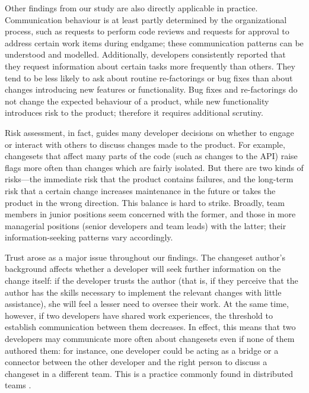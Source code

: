 \documentclass{sig-alternate}
\begin{document}
Other findings from our study are also directly applicable in practice. Communication behaviour is at least partly determined by the organizational process, such as requests to perform code reviews and requests for approval to address certain work items during endgame; these communication patterns can be understood and modelled. Additionally, developers consistently reported that they request information about certain tasks more frequently than others. They tend to be less likely to ask about routine re-factorings or bug fixes than about changes introducing new features or functionality. Bug fixes and re-factorings do not change the expected behaviour of a product, while new functionality introduces risk to the product; therefore it requires additional scrutiny.

Risk assessment, in fact, guides many developer decisions on whether to engage or interact with others to discuss changes made to the product. For example, changesets that affect many parts of the code (such as changes to the API) raise flags more often than changes which are fairly isolated. But there are two kinds of risks---the immediate risk that the product contains failures, and the long-term risk that a certain change increases maintenance in the future or takes the product in the wrong direction.
This balance is hard to strike. Broadly, team members in junior positions seem concerned with the former, and those in more managerial positions (senior developers and team leads) with the latter; their information-seeking patterns vary accordingly.

Trust arose as a major issue throughout our findings. The changeset author's background affects whether a developer will seek further information on the change itself: if the developer trusts the author (that is, if they perceive that the author has the skills necessary to implement the relevant changes with little assistance), she will feel a lesser need to oversee their work. At the same time, however, if two developers have shared work experiences, the threshold to establish communication between them decreases. In effect, this means that two developers may communicate more often about changesets even if none of them authored them: for instance, one developer could be acting as a bridge or a connector between the other developer and the right person to discuss a changeset in a different team. This is a practice commonly found in distributed teams \cite{wolf:spip:2008}.
\end{document}
